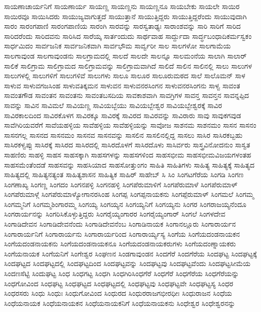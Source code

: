 {ಸಾಯಣಾಚಾರ್ಯನಿಗೆ
ಸಾಯಣಾರ್ಯ
ಸಾಯಣ್ಣ
ಸಾಯಣ್ಣನು
ಸಾಯಣ್ಣನೂ
ಸಾಯಬೇಕು
ಸಾಯಲೇ
ಸಾಯಿರ
ಸಾಯಿರವೂ
ಸಾಯಿಸಿದರು
ಸಾಯುಜ್ಯವಾಗುತ್ತದೆ
ಸಾಯುತ್ತಾನೆ
ಸಾಯುತ್ತಿದ್ದರು
ಸಾಯುತ್ತಿದ್ದರೆಂದು
ಸಾಯುವುದಾಗಿ
ಸಾರಂ
ಸಾರಂಗಪಾಣಿ
ಸಾರಂಗಪಾಣಿಯ
ಸಾರಂಗಿ
ಸಾರವನ್ನು
ಸಾರಸ್ವತಾಢ್ಯಃ
ಸಾರಾಂಶವನ್ನು
ಸಾರಿ
ಸಾರಿಗೆ
ಸಾರಿದ
ಸಾರಿದರೆಂದು
ಸಾರಿದವನು
ಸಾರಿಸಿದ
ಸಾರೆಯ್ಕ
ಸಾರ್ತಂದುದು
ಸಾರ್ಥವಾಹ
ಸಾರ್ದ್ದುದಾ
ಸಾರ್ದ್ಧಬಂಧಾದಿಕರ್ಮಸ್ವಕಂ
ಸಾರ್ಧಮಿದಂ
ಸಾರ್ವಜನಿಕ
ಸಾರ್ವಜನಿಕವಾಗಿ
ಸಾರ್ವಭೌಮ
ಸಾರ್ವ್ವರೀ
ಸಾಲ
ಸಾಲಗಳೋ
ಸಾಲಗಾಮೆಯ
ಸಾಲಗಾವುಂಡ
ಸಾಲಗಾವುಂಡನು
ಸಾಲಗ್ರಾಮದಲ್ಲಿ
ಸಾಲದೆ
ಸಾಲದೇ
ಸಾಲನ್ನೂ
ಸಾಲಮಂನೆಯ
ಸಾಲಾಗಿ
ಸಾಲಾರ್
ಸಾಲಿಕೆ
ಸಾಲಿಗ್ರಾಮ
ಸಾಲಿಗ್ರಾಮದ
ಸಾಲಿಗ್ರಾಮವನ್ನು
ಸಾಲಿಗ್ರಾಮವಾಗಿದೆ
ಸಾಲಿದೆ
ಸಾಲಿನ
ಸಾಲಿನಲ್ಲಿ
ಸಾಲು
ಸಾಲುಗಳ
ಸಾಲುಗಳಲ್ಲಿ
ಸಾಲುಗಳಿಗೆ
ಸಾಲುಗಳಿವೆ
ಸಾಲುಗಳು
ಸಾಲೂ
ಸಾಲೂರ
ಸಾಲೂರುಮಠದ
ಸಾಲೆ
ಸಾಲೊಮನ್
ಸಾಳ
ಸಾಳುವ
ಸಾಳುವಗಜಸಿಂಹ
ಸಾಳುವತಿಕ್ಕಮನ
ಸಾಳುವನ
ಸಾಳುವನರಸಿಂಗನ
ಸಾಳುವನರಸಿಂಗನು
ಸಾಳ್ವ
ಸಾವಂತ
ಸಾವಂತಗೌಡ
ಸಾವಂತನ
ಸಾವಂತನು
ಸಾವಂತಬಸದಿಯ
ಸಾವಕಾಶವಾಗಿ
ಸಾವಗ್ರಿಗಳ
ಸಾವನ್ತ
ಸಾವನ್ತನ
ಸಾವನ್ನಪ್ಪಿದ
ಸಾವನ್ನು
ಸಾವಿನ
ಸಾವಿಮಲೆ
ಸಾವಿಯಣ್ಣ
ಸಾವಿಯಬ್ಬೆಯು
ಸಾವಿಯಬ್ಬೇಶ್ವರ
ಸಾವಿಯಬ್ಬೇಶ್ವರಕ್ಕೆ
ಸಾವಿರ
ಸಾವಿರಕಾಲದಿಂದ
ಸಾವಿರಕೊಳಗ
ಸಾವಿರಕ್ಕೂ
ಸಾವಿರಕ್ಕೆ
ಸಾವಿರದ
ಸಾವಿರವನ್ನು
ಸಾವಿರಾರು
ಸಾವು
ಸಾವುಕಗವುಡ
ಸಾವೆಗಿರಿಯವರೆಗೆ
ಸಾವೆಯಹಳ್ಳಿಯ
ಸಾವೆಹಳ್ಳಿಯ
ಸಾವೆಹಳ್ಳಿಯನ್ನು
ಸಾವೋಜ
ಸಾಶನಮ
ಸಾಶನಮಂ
ಸಾಸನ
ಸಾಸನಂ
ಸಾಸನಗಲ್ಲ
ಸಾಸನದ
ಸಾಸನಮಂ
ಸಾಸನವ
ಸಾಸನವನ್ನು
ಸಾಸಲಿನ
ಸಾಸಲಿನಲ್ಲಿದ್ದ
ಸಾಸಲು
ಸಾಸಿರ
ಸಾಸಿರಕಬ್ಬಹು
ಸಾಸಿರಕಳ್ವಪ್ಪು
ಸಾಸಿರಕ್ಕೆ
ಸಾಸಿರದ
ಸಾಸಿರದಲ್ಲಿ
ಸಾಸಿರದೊಳಗೆ
ಸಾಸಿರದೊಳು
ಸಾಸಿರ್ವರು
ಸಾಸ್ತ್ರವಿನೋದನುಂ
ಸಾಸ್ವತ
ಸಾಹಣಿರು
ಸಾಹಳ್ಳಿ
ಸಾಹಸ
ಸಾಹಸಕ್ಕಾಗಿ
ಸಾಹಸಗಳನ್ನು
ಸಾಹಸಗಳಿಂದ
ಸಾಹಸಭೀಮ
ಸಾಹಸಭೀಮವಿಜಯಗಳಂತಹ
ಸಾಹಸಮೆಂತೆಂದಡೆ
ಸಾಹಸವನ್ನು
ಸಾಹಸಿಯಾದ
ಸಾಹಸೋತ್ತುಂಗಂ
ಸಾಹಿತಿ
ಸಾಹಿತಿಗಳು
ಸಾಹಿತ್ಯ
ಸಾಹಿತ್ಯಕ್ಕೆ
ಸಾಹಿತ್ಯದ
ಸಾಹಿತ್ಯದಲ್ಲಿ
ಸಾಹಿತ್ಯನತ್ಯಂತ
ಸಾಹಿತ್ಯಶಾಸನ
ಸಾಹಿತ್ಯಿಕ
ಸಾಹಿರ್
ಸಾಹೇಬ್
ಸಿ
ಸಿಂ
ಸಿಂಗಟಗೆರೆಯ
ಸಿಂಗಡಿ
ಸಿಂಗಣ
ಸಿಂಗಣಾಖ್ಯ
ಸಿಂಗಣ್ಣ
ಸಿಂಗದಂ
ಸಿಂಗನಪಳ್ಳಿ
ಸಿಂಗನಹಳ್ಳಿ
ಸಿಂಗಪೆರುಮಾಳಿಗೆ
ಸಿಂಗಪೆರುಮಾಳೆ
ಸಿಂಗಪೆರುಮಾಳ್
ಸಿಂಗಪೆರುಮಾಳ್ಗೆ
ಸಿಂಗಪೆರುಮಾಳ್ಯೋಗಾನರಸಿಂಹ
ಸಿಂಗಪ್ಪ
ಸಿಂಗಪ್ಪನಾಯಕನು
ಸಿಂಗಪ್ಪೆರುಮಾಳ್
ಸಿಂಗಮಲೆ
ಸಿಂಗಮ್ಮ
ಸಿಂಗಮ್ಮನಿಗೆ
ಸಿಂಗಮ್ಮಶಿಂಗಾರಮ್ಮ
ಸಿಂಗಯ್ಯ
ಸಿಂಗಯ್ಯನ
ಸಿಂಗಯ್ಯನಿಗೆ
ಸಿಂಗಯ್ಯನು
ಸಿಂಗರ
ಸಿಂಗರಾಜಯ್ಯನೆಂದೂ
ಸಿಂಗರಾರ್ಯನನ್ನು
ಸಿಂಗರಿಸಿಕೊಳ್ಳುತ್ತಿದ್ದರು
ಸಿಂಗರೈಯ್ಯಂಗಾರರ
ಸಿಂಗರೈಯ್ಯಂಗಾರ್
ಸಿಂಗಲೆ
ಸಿಂಗಳದೇವ
ಸಿಂಗಾಡಿದೇವನ
ಸಿಂಗಾಡಿದೇವನೆಂದು
ಸಿಂಗಾಡಿದೇವನೆಂಬ
ಸಿಂಗಾಡಿನಾಯಕ
ಸಿಂಗಾನಲ್ಲೂರು
ಸಿಂಗಾರಾರ್ಯನ
ಸಿಂಗಾರಾರ್ಯನಿಗೆ
ಸಿಂಗಾರಾರ್ಯನು
ಸಿಂಗಾರಾರ್ಯರಿಂದ
ಸಿಂಗಾರಾರ್ಯ್ಯಸ್ಯ
ಸಿಂಗೆಯ
ಸಿಂಗೆಯದಂಡನಾಯಕನ
ಸಿಂಗೆಯದಂಡನಾಯಕನು
ಸಿಂಗೆಯದಂಡನಾಯಕನೂ
ಸಿಂಗೆಯದಂಡನಾಯಕರುಗಳು
ಸಿಂಗೆಯದಂಣ್ನಾಯಕರು
ಸಿಂಗೆಯನಾಯಕ
ಸಿಂಗೆಯನಿಗೆ
ಸಿಂಗೇಶ್ವರ
ಸಿಂಘಣನ
ಸಿಂಡಗಾವುಂಡನ
ಸಿಂದಗೆರೆ
ಸಿಂದಗೆರೆಯ
ಸಿಂದಘಟ್ಟ
ಸಿಂದಘಟ್ಟಕ್ಕೆ
ಸಿಂದಘಟ್ಟದ
ಸಿಂದಘಟ್ಟದಲ್ಲಿ
ಸಿಂದಘಟ್ಟದಿಂದ
ಸಿಂದಘಟ್ಟವನ್ನು
ಸಿಂದಘಟ್ಟವು
ಸಿಂದಘಟ್ಟವೆಂದು
ಸಿಂದಘಟ್ಟಸೀಮೆಯ
ಸಿಂದಣಸೆಟ್ಟಿ
ಸಿಂದುಘಟ್ಟ
ಸಿಂಧ
ಸಿಂಧಗಟ್ಟ
ಸಿಂಧಗಿ
ಸಿಂಧಗಿರಿಸಿಂಧಗೆರೆ
ಸಿಂಧಗೆರೆ
ಸಿಂಧಗೆರೆಯ
ಸಿಂಧಗೆರೆಯನ್ನು
ಸಿಂಧಗೋವಿಂದ
ಸಿಂಧಘಟ್ಟ
ಸಿಂಧಘಟ್ಟದ
ಸಿಂಧಘಟ್ಟದಲ್ಲಿ
ಸಿಂಧಘಟ್ಟವು
ಸಿಂಧಘಟ್ಟವೇ
ಸಿಂಧಘಟ್ಟಸ್ಯ
ಸಿಂಧರ
ಸಿಂಧರಸರು
ಸಿಂಧು
ಸಿಂಧುಃ
ಸಿಂಧುಗೋವಿಂದ
ಸಿಂಧುರದ
ಸಿಂಧುರರಾಜಗಭೀರಧೀಃ
ಸಿಂಧುರಾಜನ
ಸಿಂಧೆಯ
ಸಿಂಧೆಯನಾಯಕ
ಸಿಂಧೆಯನಾಯಕನ
ಸಿಂಧೆಯನಾಯಕನಿಗೆ
ಸಿಂಧೆಯನಾಯಕನು
ಸಿಂಧೇಶ್ವರ
ಸಿಂಧೇಶ್ವರನನ್ನು
}
